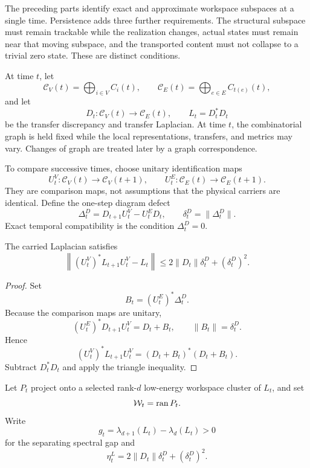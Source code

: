 
The preceding parts identify exact and approximate workspace subspaces at a
single time. Persistence adds three further requirements. The structural
subspace must remain trackable while the realization changes, actual states
must remain near that moving subspace, and the transported content must not
collapse to a trivial zero state. These are distinct conditions.



At time \(t\), let
\[
\mathcal C_V(t)=\bigoplus_{i\in V}C_i(t),
\qquad
\mathcal C_E(t)=\bigoplus_{e\in E}C_{t(e)}(t),
\]
and let
\[
D_t:\mathcal C_V(t)\longrightarrow\mathcal C_E(t),
\qquad
L_t=D_t^*D_t
\]
be the transfer discrepancy and transfer Laplacian. At time \(t\), the
combinatorial graph is held fixed while the local representations, transfers,
and metrics may vary. Changes of graph are treated later by a graph
correspondence.

To compare successive times, choose unitary identification maps
\[
U_t^V:\mathcal C_V(t)\longrightarrow\mathcal C_V(t+1),
\qquad
U_t^E:\mathcal C_E(t)\longrightarrow\mathcal C_E(t+1).
\]
They are comparison maps, not assumptions that the physical carriers are
identical. Define the one-step diagram defect
\[
\boxed{
\Delta_t^D
=
D_{t+1}U_t^V-U_t^ED_t,
\qquad
\delta_t^D=\|\Delta_t^D\|.
}
\]
Exact temporal compatibility is the condition \(\Delta_t^D=0\).

\begin{proposition}\label{prop:temporal-laplacian-drift}
The carried Laplacian satisfies
\[
\boxed{
\left\|
(U_t^V)^*L_{t+1}U_t^V-L_t
\right\|
\leq
2\|D_t\|\delta_t^D+(\delta_t^D)^2.
}
\]
\end{proposition}

\begin{proof}
Set
\[
B_t=(U_t^E)^*\Delta_t^D.
\]
Because the comparison maps are unitary,
\[
(U_t^E)^*D_{t+1}U_t^V=D_t+B_t,
\qquad
\|B_t\|=\delta_t^D.
\]
Hence
\[
(U_t^V)^*L_{t+1}U_t^V
=(D_t+B_t)^*(D_t+B_t).
\]
Subtract \(D_t^*D_t\) and apply the triangle inequality.
\end{proof}

Let \(P_t\) project onto a selected rank-\(d\) low-energy workspace cluster
of \(L_t\), and set
\[
\mathcal W_t=\operatorname{ran} P_t.
\]
Write
\[
g_t=\lambda_{d+1}(L_t)-\lambda_d(L_t)>0
\]
for the separating spectral gap and
\[
\eta_t^L=2\|D_t\|\delta_t^D+(\delta_t^D)^2.
\]

